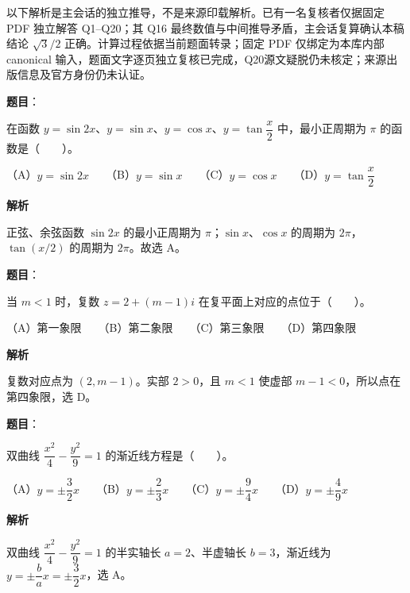 

\begin{gktip}
以下解析是主会话的独立推导，不是来源印载解析。已有一名复核者仅据固定 PDF 独立解答 Q1–Q20；其 Q16 最终数值与中间推导矛盾，主会话复算确认本稿结论 $\sqrt3/2$ 正确。计算过程依据当前题面转录；固定 PDF 仅绑定为本库内部 canonical 输入，题面文字逐页独立复核已完成，Q20源文疑脱仍未核定；来源出版信息及官方身份仍未认证。
\end{gktip}

\begin{answer}

\textbf{题目}：

在函数 $y=\sin 2x$、$y=\sin x$、$y=\cos x$、$y=\tan\dfrac{x}{2}$ 中，最小正周期为 $\pi$ 的函数是\mbox{（　　）}。

（A）$y=\sin 2x$　　（B）$y=\sin x$　　（C）$y=\cos x$　　（D）$y=\tan\dfrac{x}{2}$

\textbf{解析}

正弦、余弦函数 $\sin 2x$ 的最小正周期为 $\pi$；$\sin x$、$\cos x$ 的周期为 $2\pi$，$\tan(x/2)$ 的周期为 $2\pi$。故选 A。


\end{answer}
\begin{answer}

\textbf{题目}：

当 $m<1$ 时，复数 $z=2+(m-1)i$ 在复平面上对应的点位于\mbox{（　　）}。

（A）第一象限　　（B）第二象限　　（C）第三象限　　（D）第四象限

\textbf{解析}

复数对应点为 $(2,m-1)$。实部 $2>0$，且 $m<1$ 使虚部 $m-1<0$，所以点在第四象限，选 D。


\end{answer}
\begin{answer}

\textbf{题目}：

双曲线 $\dfrac{x^2}{4}-\dfrac{y^2}{9}=1$ 的渐近线方程是\mbox{（　　）}。

（A）$y=\pm\dfrac{3}{2}x$　　（B）$y=\pm\dfrac{2}{3}x$　　（C）$y=\pm\dfrac{9}{4}x$　　（D）$y=\pm\dfrac{4}{9}x$

\textbf{解析}

双曲线 $\dfrac{x^2}{4}-\dfrac{y^2}{9}=1$ 的半实轴长 $a=2$、半虚轴长 $b=3$，渐近线为 $y=\pm\dfrac ba x=\pm\dfrac32x$，选 A。


\end{answer}
